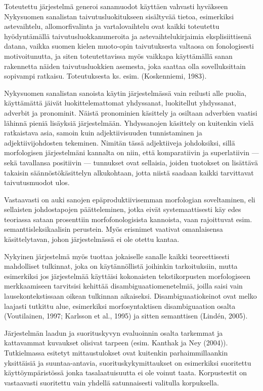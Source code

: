 \documentclass[free]{flammie}
\begin{document}
Toteutettu järjestelmä generoi sanamuodot käyttäen vahvasti hyväkseen Nykysuomen sanalistan taivutusluokitukseen sisältyvää tietoa, esimerkiksi astevaihtelu,
allomorfivalinta ja vartalovaihtelu ovat kaikki toteutettu hyödyntämällä taivutusluokkanumeroita ja astevaihtelukirjaimia eksplisiittisenä datana, vaikka suomen
kielen muoto-opin taivutuksesta valtaosa on fonologisesti motivoitunutta, ja siten
toteutettavissa myös vaikkapa käyttämällä sanan rakennetta näiden taivutusluokkien asemesta, joka saattaa olla sovelluksittain sopivampi ratkaisu. Toteutuksesta
ks. esim. (Koskenniemi, 1983).

Nykysuomen sanalistan sanoista käytin järjestelmässä vain reilusti alle puolia,
käyttämättä jäivät luokittelemattomat yhdyssanat, luokitellut yhdyssanat, adverbit ja pronominit. Näistä pronominien käsittely ja osiltaan adverbien vaatisi lähinnä pieniä lisäyksiä järjestelmään. Yhdyssanojen käsittely on kuitenkin vielä ratkaistava asia, samoin kuin adjektiivisuuden tunnistaminen ja adjektiivijohdosten
tekeminen. Nimitän tässä adjektiiveja johdoksiksi, sillä morfologisen järjestelmäni kannalta on niin, että komparatiivin ja superlatiivin — sekä tavallansa positiivin
— tunnukset ovat sellaisia, joiden tuotokset on lisättävä takaisin säännöstökäsittelyn alkukohtaan, jotta niistä saadaan kaikki tarvittavat taivutusmuodot ulos.

Vastaavasti on auki sanojen epäproduktiivisemman morfologian soveltaminen, eli
sellaisten johdostapojen päätteleminen, jotka eivät systemaattisesti käy edes teoriassa sataan prosenttiin morfofonologisista kannoista, vaan rajoittuvat esim. semanttisleksikaalisin perustein. Myös erisnimet vaativat omanlaisensa käsittelytavan, johon järjestelmässä ei ole otettu kantaa.

Nykyinen järjestelmä myös tuottaa jokaiselle sanalle kaikki teoreettisesti mahdolliset tulkinnat, joka on käytännöllistä joihinkin tarkoituksiin, mutta esimerkiksi jos järjestelmää käyttäisi kokonaisten tekstikorpusten morfologiseen merkkaamiseen tarvitsisi kehittää disambiguaatiomenetelmiä, joilla saisi vain lausekontekstissaan oikean tulkinnan aikaiseksi. Disambiguaatiokeinot ovat melko laajasti
tutkittu alue, esimerkiksi morfosyntaktisen disambiguaation osalta (Voutilainen,
1997; Karlsson et al., 1995) ja sitten semanttisen (Lindén, 2005).

Järjestelmän laadun ja suorituskyvyn evaluoinnin osalta tarkemmat ja kattavammat kuvaukset olisivat tarpeen (esim. Kanthak ja Ney (2004)). Tutkielmassa
esitetyt mittaustulokset ovat kuitenkin parhaimmillaankin yksittäisiä ja
suuntaa-antavia, suorituskykymittaukset on esimerkiksi suoritettu käyttöympäristössä jonka tasalaatuisuutta ei ole voinut taata. Korpustestit on vastaavasti suoritettu vain
yhdellä satunnaisesti valitulla korpuksella.
\end{document}
